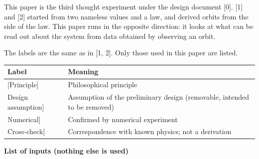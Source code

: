 \documentclass[
  a4paper,
]{article}
\newcounter{none} %
\begin{document}
This paper is the third thought experiment under the design document
{[}0{]}. {[}1{]} and {[}2{]} started from two nameless values and a law,
and derived orbits from the side of the law. This paper runs in the
opposite direction: it looks at what can be read out about the system
from data obtained by observing an orbit.

The labels are the same as in {[}1, 2{]}. Only those used in this paper
are listed.

{\def\LTcaptype{none} %
\begin{longtable}[]{@{}
  >{\raggedright\arraybackslash}p{}
  >{\raggedright\arraybackslash}p{}@{}}
\toprule\noalign{}
\begin{minipage}[b]{\linewidth}\raggedright
Label
\end{minipage} & \begin{minipage}[b]{\linewidth}\raggedright
Meaning
\end{minipage} \\
\midrule\noalign{}
\endhead
\bottomrule\noalign{}
\endlastfoot
{[}Principle{]} & Philosophical principle \\
{[}Design assumption{]} & Assumption of the preliminary design
(removable, intended to be removed) \\
{[}Numerical{]} & Confirmed by numerical experiment \\
{[}Cross-check{]} & Correspondence with known physics; not a
derivation \\
\end{longtable}
}

\textbf{List of inputs (nothing else is used)}
\end{document}
